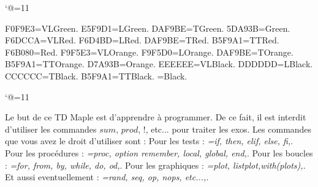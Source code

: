 \catcode`@=11\relax





\DefineRGBcolor F0F9E3=VLGreen.
\DefineRGBcolor E5F9D1=LGreen.
\DefineRGBcolor DAF9BE=TGreen.
\DefineRGBcolor 5DA93B=Green.
\DefineRGBcolor F6DCCA=VLRed.
\DefineRGBcolor F6D4BD=LRed.
\DefineRGBcolor DAF9BE=TRed.
\DefineRGBcolor B5F9A1=TTRed.
\DefineRGBcolor F6B080=Red.
\DefineRGBcolor F9F5E3=VLOrange.
\DefineRGBcolor F9F5D0=LOrange.
\DefineRGBcolor DAF9BE=TOrange.
\DefineRGBcolor B5F9A1=TTOrange.
\DefineRGBcolor D7A93B=Orange.
\DefineRGBcolor EEEEEE=VLBlack.
\DefineRGBcolor DDDDDD=LBlack.
\DefineRGBcolor CCCCCC=TBlack.
\DefineRGBcolor B5F9A1=TTBlack.
=Black.


\catcode`@=11\relax


\def\MapleCommands#1{{\it\LD@Loop@For\LD@Command=#1\WithSeparator,\Do{\LD@Command\unless\ifx\LD@Loop@For@Tail\LD@Empty,\fi}}}%
\def\MapleSolution#1{\par\noindent Solution de l'exercice \ref{labelexo#1} : \par\noindent}

\vglue-10mm
\bigskip
\bigskip



Le but de ce TD Maple est d'apprendre \`a programmer. De ce fait, il est interdit d'utiliser les commandes $sum$, $prod$, $!$, etc... pour traiter les exos.\pn
Les commandes que vous avez le droit d'utiliser sont :  
\medskip\noindent
Pour les tests : \MapleCommands{if, then, elif, else, fi}.\pn 
Pour les proc\'edures : \MapleCommands{proc, option remember, local, global, end}.\pn 
Pour les boucles : \MapleCommands{for, from, by, while, do, od}.\pn 
Pour les graphiques : \MapleCommands{plot, listplot,with(plots)}.\pn 
Et aussi eventuellement : \MapleCommands{rand, seq, op, nops, etc...}. 
\medskip

\bigskip

